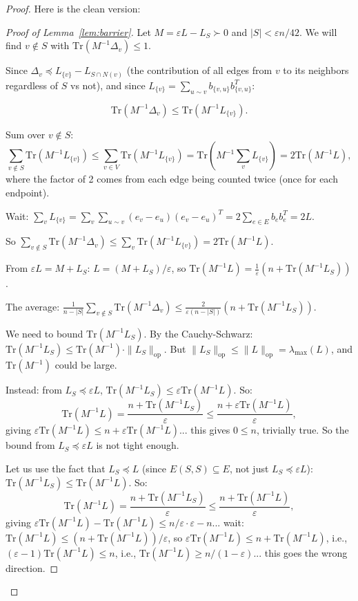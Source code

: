 \documentclass[12pt]{article}
\theoremstyle{definition}
\begin{document}
\begin{proof}
Here is the clean version:

\begin{proof}[Proof of Lemma~\ref{lem:barrier}]
Let $M = \varepsilon L - L_S \succ 0$ and $|S| < \varepsilon n/42$. We will find $v\notin S$ with $\mathrm{Tr}(M^{-1}\Delta_v)\leq 1$.

Since $\Delta_v \preceq L_{\{v\}} - L_{S\cap N(v)}$ (the contribution of all edges from $v$ to its neighbors regardless of $S$ vs not), and since $L_{\{v\}} = \sum_{u\sim v}b_{\{v,u\}}b_{\{v,u\}}^T$:

$$\mathrm{Tr}(M^{-1}\Delta_v) \leq \mathrm{Tr}(M^{-1}L_{\{v\}}).$$

Sum over $v\notin S$:
$$\sum_{v\notin S}\mathrm{Tr}(M^{-1}L_{\{v\}}) \leq \sum_{v\in V}\mathrm{Tr}(M^{-1}L_{\{v\}}) = \mathrm{Tr}\!\left(M^{-1}\sum_v L_{\{v\}}\right) = 2\mathrm{Tr}(M^{-1}L),$$
where the factor of 2 comes from each edge being counted twice (once for each endpoint).

Wait: $\sum_v L_{\{v\}} = \sum_v\sum_{u\sim v}(e_v-e_u)(e_v-e_u)^T = 2\sum_{e\in E}b_eb_e^T = 2L$.

So $\sum_{v\notin S}\mathrm{Tr}(M^{-1}\Delta_v)\leq\sum_v\mathrm{Tr}(M^{-1}L_{\{v\}}) = 2\mathrm{Tr}(M^{-1}L)$.

From $\varepsilon L = M + L_S$: $L = (M+L_S)/\varepsilon$, so $\mathrm{Tr}(M^{-1}L) = \frac{1}{\varepsilon}(n + \mathrm{Tr}(M^{-1}L_S))$.

The average: $\frac{1}{n-|S|}\sum_{v\notin S}\mathrm{Tr}(M^{-1}\Delta_v) \leq \frac{2}{\varepsilon(n-|S|)}(n+\mathrm{Tr}(M^{-1}L_S))$.

We need to bound $\mathrm{Tr}(M^{-1}L_S)$. By the Cauchy-Schwarz: $\mathrm{Tr}(M^{-1}L_S)\leq\mathrm{Tr}(M^{-1})\cdot\|L_S\|_{\mathrm{op}}$. But $\|L_S\|_{\mathrm{op}}\leq\|L\|_{\mathrm{op}} = \lambda_{\max}(L)$, and $\mathrm{Tr}(M^{-1})$ could be large.

Instead: from $L_S\preceq\varepsilon L$, $\mathrm{Tr}(M^{-1}L_S)\leq\varepsilon\mathrm{Tr}(M^{-1}L)$. So:
$$\mathrm{Tr}(M^{-1}L) = \frac{n + \mathrm{Tr}(M^{-1}L_S)}{\varepsilon} \leq \frac{n + \varepsilon\mathrm{Tr}(M^{-1}L)}{\varepsilon},$$
giving $\varepsilon\mathrm{Tr}(M^{-1}L)\leq n + \varepsilon\mathrm{Tr}(M^{-1}L)$... this gives $0\leq n$, trivially true. So the bound from $L_S\preceq\varepsilon L$ is not tight enough.

Let us use the fact that $L_S\preceq L$ (since $E(S,S)\subseteq E$, not just $L_S\preceq\varepsilon L$):
$\mathrm{Tr}(M^{-1}L_S)\leq\mathrm{Tr}(M^{-1}L)$. So:
$$\mathrm{Tr}(M^{-1}L) = \frac{n+\mathrm{Tr}(M^{-1}L_S)}{\varepsilon}\leq\frac{n+\mathrm{Tr}(M^{-1}L)}{\varepsilon},$$
giving $\varepsilon\mathrm{Tr}(M^{-1}L) - \mathrm{Tr}(M^{-1}L) \leq n/\varepsilon\cdot\varepsilon - n$... wait: $\mathrm{Tr}(M^{-1}L)\leq(n+\mathrm{Tr}(M^{-1}L))/\varepsilon$, so $\varepsilon\mathrm{Tr}(M^{-1}L)\leq n+\mathrm{Tr}(M^{-1}L)$, i.e., $(\varepsilon-1)\mathrm{Tr}(M^{-1}L)\leq n$, i.e., $\mathrm{Tr}(M^{-1}L)\geq n/(1-\varepsilon)$... this goes the wrong direction.


\end{proof}
\end{proof}
\end{document}
